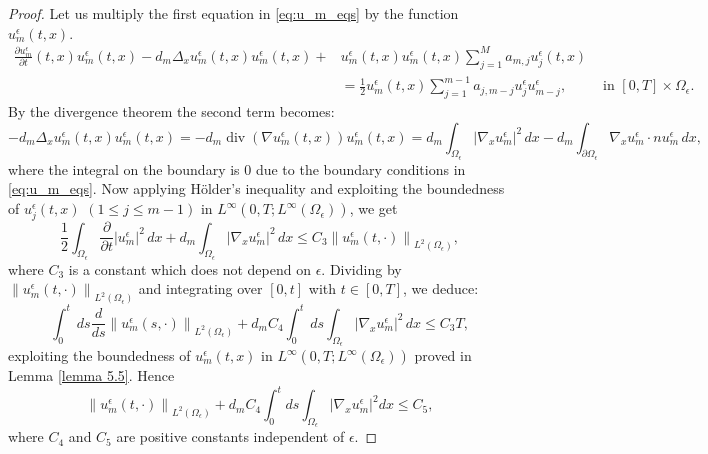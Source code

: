 \begin{proof}
 Let us multiply the first equation in \eqref{eq:u_m_eqs} by the function $u_{m}^{\epsilon}(t, x)$.
 \begin{equation*}
 \begin{aligned}
 \frac{\partial u_{m}^{\epsilon}}{\partial t}(t, x)u_{m}^{\epsilon}(t, x)-d_{m} \Delta_{x} u_{m}^{\epsilon}(t, x)u_{m}^{\epsilon}(t, x)+&u_{m}^{\epsilon}(t, x)u_{m}^{\epsilon}(t, x) \sum_{j=1}^{M} a_{m, j} u_{j}^{\epsilon}(t, x)\\ 
 &=\frac{1}{2} u_{m}^{\epsilon}(t, x)\sum_{j=1}^{m-1} a_{j, m-j} u_{j}^{\epsilon} u_{m-j}^{\epsilon}, & \text { in }[0, T] \times \Omega_{\epsilon}.
     \end{aligned}
 \end{equation*}
By the divergence theorem the second term becomes:
 \begin{equation*}
     -d_{m} \Delta_{x} u_{m}^{\epsilon}(t, x)u_{m}^{\epsilon}(t, x)= -d_m\operatorname{div} (\nabla u_{m}^{\epsilon}(t, x) )u_{m}^{\epsilon}(t, x)=d_m \int_{\Omega_\epsilon} \left|\nabla_{x} u_{m}^{\epsilon}\right|^{2} \, d  x - d_m\int_{\partial \Omega_\epsilon} \nabla_{x} u_{m}^{\epsilon} \cdot n u_{m}^{\epsilon} \, d  x,
 \end{equation*}
where the integral on the boundary is $0$ due to the boundary conditions in \eqref{eq:u_m_eqs}.
Now applying Hölder's inequality and exploiting the boundedness of $u_{j}^{\epsilon}(t, x)$ $(1 \leq j \leq m-1)$ in $L^{\infty}\left(0, T ; L^{\infty}\left(\Omega_{\epsilon}\right)\right)$, we get
\begin{equation}
  \frac{1}{2} \int_{\Omega_{\epsilon}} \frac{\partial}{\partial t}\left|u_{m}^{\epsilon}\right|^{2} \, d  x+d_{m} \int_{\Omega_{\epsilon}}\left|\nabla_{x} u_{m}^{\epsilon}\right|^{2} \, d  x \leq C_{3}\left\|u_{m}^{\epsilon}(t, \cdot)\right\|_{L^{2}\left(\Omega_{\epsilon}\right)},
\label{eq 64}\end{equation}
where $C_{3}$ is a constant which does not depend on $\epsilon$. Dividing by $\left\|u_{m}^{\epsilon}(t, \cdot)\right\|_{L^{2}\left(\Omega_{\epsilon}\right)}$ and integrating over $[0, t]$ with $t \in[0, T]$, we deduce:
\begin{equation}
  \int_{0}^{t} \, d  s \frac{{d}}{{d} s}\left\|u_{m}^{\epsilon}(s, \cdot)\right\|_{L^{2}\left(\Omega_{\epsilon}\right)}+d_{m} C_{4} \int_{0}^{t} \, d  s \int_{\Omega_{\epsilon}}\left|\nabla_{x} u_{m}^{\epsilon}\right|^{2} \, d  x \leq C_{3} T,
\label{eq 65}\end{equation}
exploiting the boundedness of $u_{m}^{\epsilon}(t, x)$ in $L^{\infty}\left(0, T ; L^{\infty}\left(\Omega_{\epsilon}\right)\right)$ proved in Lemma \eqref{lemma 5.5}. Hence
\begin{equation}
  \left\|u_{m}^{\epsilon}(t, \cdot)\right\|_{L^{2}\left(\Omega_{\epsilon}\right)}+d_{m} C_{4} \int_{0}^{t} d  s \int_{\Omega_{\epsilon}}\left|\nabla_{x} u_{m}^{\epsilon}\right|^{2} d  x \leq C_{5},
\label{eq 66}\end{equation}
where $C_{4}$ and $C_{5}$ are positive constants independent of $\epsilon$.


\end{proof}
